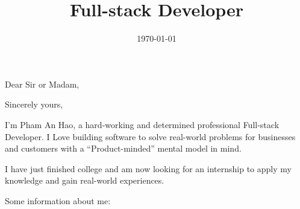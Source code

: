\documentclass[11pt,a4paper,sans]{moderncv}        %
\title{Full-stack Developer}
\begin{document}
\clearpage

\recipient{\phantom{T}}{\phantom{T}}
\date{\today}
\opening{Dear Sir or Madam,}
\closing{Sincerely yours,}
\makelettertitle

I'm Pham An Hao, a hard-working and determined professional Full-stack Developer. I Love building software to solve real-world problems for businesses and customers with a ``Product-minded'' mental model in mind.



I have just finished college and am now looking for an internship to apply my knowledge and gain real-world experiences.

Some information about me:

\end{document}
